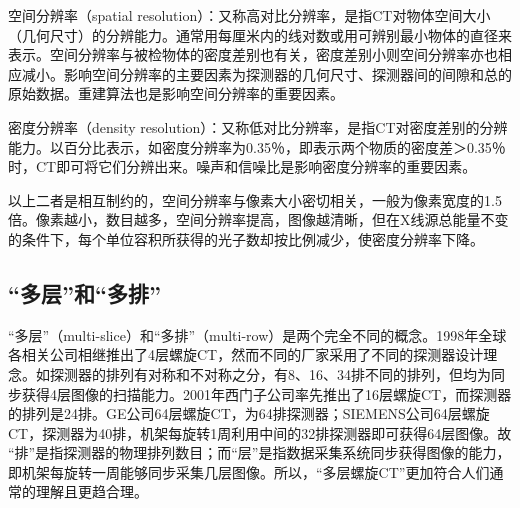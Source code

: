 空间分辨率（spatial
resolution）：又称高对比分辨率，是指CT对物体空间大小（几何尺寸）的分辨能力。通常用每厘米内的线对数或用可辨别最小物体的直径来表示。空间分辨率与被检物体的密度差别也有关，密度差别小则空间分辨率亦也相应减小。影响空间分辨率的主要因素为探测器的几何尺寸、探测器间的间隙和总的原始数据。重建算法也是影响空间分辨率的重要因素。

密度分辨率（density
resolution）：又称低对比分辨率，是指CT对密度差别的分辨能力。以百分比表示，如密度分辨率为0.35％，即表示两个物质的密度差＞0.35％时，CT即可将它们分辨出来。噪声和信噪比是影响密度分辨率的重要因素。

以上二者是相互制约的，空间分辨率与像素大小密切相关，一般为像素宽度的1.5倍。像素越小，数目越多，空间分辨率提高，图像越清晰，但在X线源总能量不变的条件下，每个单位容积所获得的光子数却按比例减少，使密度分辨率下降。

\subsection{“多层”和“多排”}

“多层”（multi-slice）和“多排”（multi-row）是两个完全不同的概念。1998年全球各相关公司相继推出了4层螺旋CT，然而不同的厂家采用了不同的探测器设计理念。如探测器的排列有对称和不对称之分，有8、16、34排不同的排列，但均为同步获得4层图像的扫描能力。2001年西门子公司率先推出了16层螺旋CT，而探测器的排列是24排。GE公司64层螺旋CT，为64排探测器；SIEMENS公司64层螺旋CT，探测器为40排，机架每旋转1周利用中间的32排探测器即可获得64层图像。故
“排”是指探测器的物理排列数目；而“层”是指数据采集系统同步获得图像的能力，即机架每旋转一周能够同步采集几层图像。所以，“多层螺旋CT”更加符合人们通常的理解且更趋合理。

\protect\hypertarget{text00009.html}{}{}

